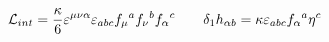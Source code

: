 \begin{equation}
{\cal L}_{int} = \frac{\kappa}{6} \varepsilon^{\mu\nu\alpha}
\varepsilon_{abc} f_\mu{}^a f_\nu{}^b f_\alpha{}^c \qquad \delta_1
h_{\alpha b} = \kappa \varepsilon_{abc} f_\alpha{}^a \eta^c
\end{equation}

